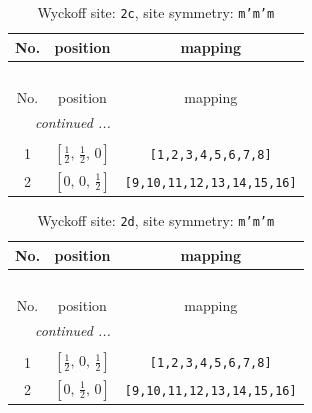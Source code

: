 \documentclass[fleqn,8pt]{jsarticle}
\begin{document}
\renewcommand{\arraystretch}{1.2}
\begin{longtable}{ccc}
\caption{Wyckoff site: {\tt 2c}, site symmetry: {\tt m'm'm}}
 \\
 \hline \hline
No. & position & mapping \\ \hline \endfirsthead

\multicolumn{2}{l}{\tablename\ \thetable{}} \\
 \hline \hline
No. & position & mapping \\ \hline \endhead

 \hline \hline
\multicolumn{2}{r}{\footnotesize\it continued ...} \\ \endfoot

 \hline \hline
\multicolumn{2}{r}{} \\ \endlastfoot

1 & $\left[ \frac{1}{2},\, \frac{1}{2},\, 0 \right]$ & {\tt [1,2,3,4,5,6,7,8]} \\ \hline
2 & $\left[ 0,\, 0,\, \frac{1}{2} \right]$ & {\tt [9,10,11,12,13,14,15,16]} \\
\end{longtable}
\renewcommand{\arraystretch}{1.2}
\begin{longtable}{ccc}
\caption{Wyckoff site: {\tt 2d}, site symmetry: {\tt m'm'm}}
 \\
 \hline \hline
No. & position & mapping \\ \hline \endfirsthead

\multicolumn{2}{l}{\tablename\ \thetable{}} \\
 \hline \hline
No. & position & mapping \\ \hline \endhead

 \hline \hline
\multicolumn{2}{r}{\footnotesize\it continued ...} \\ \endfoot

 \hline \hline
\multicolumn{2}{r}{} \\ \endlastfoot

1 & $\left[ \frac{1}{2},\, 0,\, \frac{1}{2} \right]$ & {\tt [1,2,3,4,5,6,7,8]} \\ \hline
2 & $\left[ 0,\, \frac{1}{2},\, 0 \right]$ & {\tt [9,10,11,12,13,14,15,16]} \\
\end{longtable}
\renewcommand{\arraystretch}{1.2}
\end{document}
